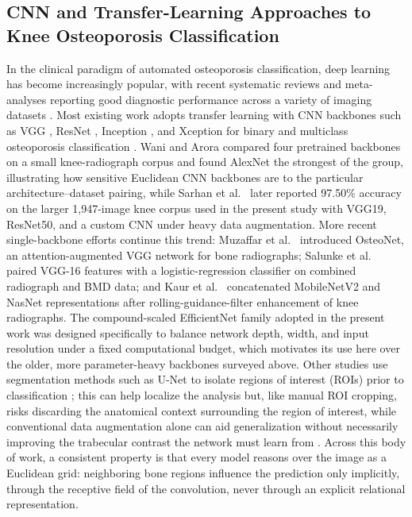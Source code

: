 \documentclass[conference]{IEEEtran}
\begin{document}
\subsection{CNN and Transfer-Learning Approaches to Knee Osteoporosis Classification}
In the clinical paradigm of automated osteoporosis classification, deep learning has become increasingly popular, with recent systematic reviews and meta-analyses reporting good diagnostic performance across a variety of imaging datasets \cite{Amani2024, yen2024diagnostic, wasti2025deep}. Most existing work adopts transfer learning with CNN backbones such as VGG \cite{simonyan2015very}, ResNet \cite{he2016deep}, Inception \cite{szegedy2015going}, and Xception \cite{chollet2017xception} for binary and multiclass osteoporosis classification \cite{Chen2024, Feng2024, wani2023osteoporosis, Sarhan2024}. Wani and Arora \cite{wani2023osteoporosis} compared four pretrained backbones on a small knee-radiograph corpus and found AlexNet the strongest of the group, illustrating how sensitive Euclidean CNN backbones are to the particular architecture--dataset pairing, while Sarhan et al.\ \cite{Sarhan2024} later reported 97.50\% accuracy on the larger 1,947-image knee corpus used in the present study with VGG19, ResNet50, and a custom CNN under heavy data augmentation. More recent single-backbone efforts continue this trend: Muzaffar et al.\ \cite{muzaffar2025osteonet} introduced OsteoNet, an attention-augmented VGG network for bone radiographs; Salunke et al.\ \cite{salunke2025osteoporosis} paired VGG-16 features with a logistic-regression classifier on combined radiograph and BMD data; and Kaur et al.\ \cite{kaur2026interpretable} concatenated MobileNetV2 and NasNet representations after rolling-guidance-filter enhancement of knee radiographs. The compound-scaled EfficientNet family \cite{tan2019efficientnet} adopted in the present work was designed specifically to balance network depth, width, and input resolution under a fixed computational budget, which motivates its use here over the older, more parameter-heavy backbones surveyed above. Other studies use segmentation methods such as U-Net \cite{ronneberger2015unet} to isolate regions of interest (ROIs) prior to classification \cite{Feng2024, Chen2024}; this can help localize the analysis but, like manual ROI cropping, risks discarding the anatomical context surrounding the region of interest, while conventional data augmentation alone can aid generalization without necessarily improving the trabecular contrast the network must learn from \cite{Naguib2024, Sarhan2024}. Across this body of work, a consistent property is that every model reasons over the image as a Euclidean grid: neighboring bone regions influence the prediction only implicitly, through the receptive field of the convolution, never through an explicit relational representation.
\end{document}
